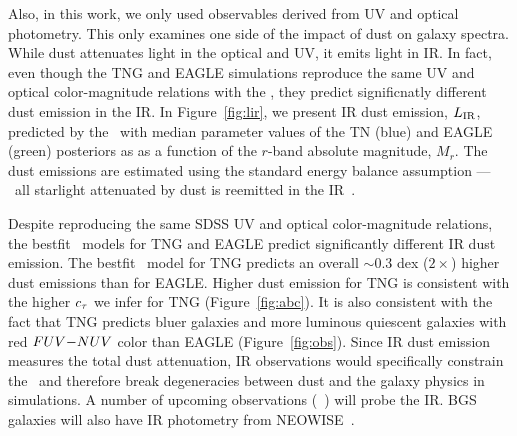 Also, in this work, we only used observables derived from UV and optical
photometry. This only examines one side of the impact of dust on galaxy
spectra. While dust attenuates light in the optical and UV, it emits light in
IR. In fact, even though the TNG and EAGLE simulations reproduce the same UV and
optical color-magnitude relations with the \eda, they predict significnatly 
different dust emission in the IR. In Figure~\ref{fig:lir}, we present IR dust
emission, $L_{\rm IR}$, predicted by the \eda~with median parameter values of 
the TN (blue) and EAGLE (green) posteriors as as a function of the $r$-band 
absolute magnitude, $M_r$. The dust emissions are estimated using the standard
energy balance assumption --- \ie~all starlight attenuated by dust is reemitted 
in the IR~\citep{dacunha2008}. 

Despite reproducing the same SDSS UV and optical color-magnitude relations, the
bestfit \eda~models for TNG and EAGLE predict significantly different IR dust
emission. The bestfit \eda~model for TNG predicts an overall ${\sim}0.3$ dex
($2\times$) higher dust emissions than for EAGLE. Higher dust emission for TNG
is consistent with the higher $c_\tau$ we infer for TNG (Figure~\ref{fig:abc}).
It is also consistent with the fact that TNG predicts bluer galaxies and more
luminous quiescent galaxies with red $FUV{-}NUV$ color than EAGLE
(Figure~\ref{fig:obs}). Since IR dust emission measures the total dust
attenuation, IR observations would specifically constrain the \eda~and
therefore break degeneracies between dust and the galaxy physics in simulations.
A number of upcoming observations (\eg~) will probe the IR. BGS galaxies will also have IR photometry from
NEOWISE~\citep{meisner2018}. 




